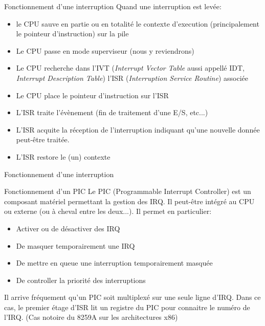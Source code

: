 \begin{frame}{Fonctionnement d'une interruption}
  Quand une  interruption est levée:
  \begin{itemize} 
  \item le CPU sauve en  partie ou en totalité le contexte d'execution
    (principalement le pointeur d'instruction) sur la pile
  \item Le CPU passe en mode superviseur (nous y reviendrons)
  \item  Le CPU  recherche dans  l'IVT (\emph{Interrupt  Vector Table}
    aussi  appellé  IDT,  \emph{Interrupt  Description  Table})  l'ISR
    (\emph{Interruption Service Routine}) associée
  \item Le CPU place le pointeur d'instruction sur l'ISR
  \item  L'ISR traite  l'évènement (fin  de traitement  d'une E/S,
    etc...)
  \item L'ISR acquite la  réception de l'interruption indiquant qu'une
    nouvelle  donnée peut-être  traitée.
  \item L'ISR restore le (un) contexte
  \end{itemize}
\end{frame}

\begin{frame}[fragile]{Fonctionnement d'une interruption} 
  \begin{center}
  \end{center}
\end{frame}  

\begin{frame}{Fonctionnement d'un PIC}
  Le PIC (Programmable Interrupt Controller) est un composant matériel
  permettant  la gestion  des  IRQ.  Il peut-être  intégré  au CPU  ou
  externe (ou à cheval entre les deux...). Il permet en particulier:
  \begin{itemize}
  \item Activer ou de désactiver des IRQ
  \item De masquer temporairement une IRQ
  \item De mettre en queue une interruption temporairement masquée
  \item De controller la priorité des interruptions
  \end{itemize} 
  Il arrive fréquement  qu'un PIC soit multiplexé sur  une seule ligne
  d'IRQ. Dans  ce cas, le premier  étage d'ISR lit un  registre du PIC
  pour connaitre  le numéro de l'IRQ.   (Cas notoire du  8259A sur les
  architectures x86)

\end{frame} 

